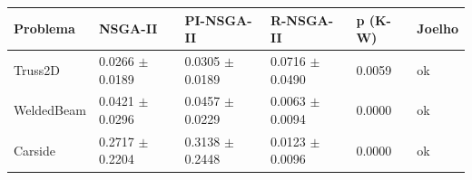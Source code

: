 \begin{tabular}{llllll}
\toprule
Problema & NSGA-II & PI-NSGA-II & R-NSGA-II & p (K-W) & Joelho \\
\midrule
Truss2D & 0.0266 $\pm$ 0.0189 & 0.0305 $\pm$ 0.0189 & 0.0716 $\pm$ 0.0490 & 0.0059 & ok \\
WeldedBeam & 0.0421 $\pm$ 0.0296 & 0.0457 $\pm$ 0.0229 & 0.0063 $\pm$ 0.0094 & 0.0000 & ok \\
Carside & 0.2717 $\pm$ 0.2204 & 0.3138 $\pm$ 0.2448 & 0.0123 $\pm$ 0.0096 & 0.0000 & ok \\
\bottomrule
\end{tabular}
